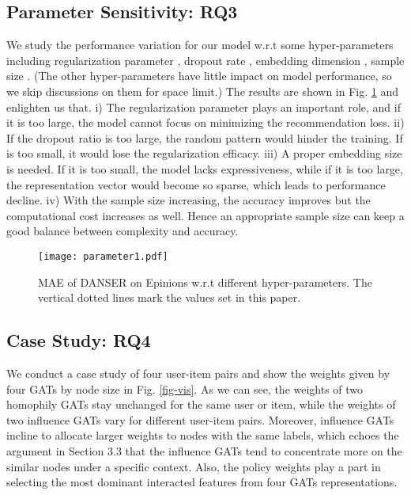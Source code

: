 \documentclass[sigconf]{acmart}
\begin{document}
\subsection{Parameter Sensitivity: RQ3}

We study the performance variation for our model w.r.t some hyper-parameters including regularization parameter , dropout rate , embedding dimension , sample size . (The other hyper-parameters have little impact on model performance, so we skip discussions on them for space limit.) The results are shown in Fig. \ref{fig-parameter} and enlighten us that. i) The regularization parameter plays an important role, and if it is too large, the model cannot focus on minimizing the recommendation loss. ii) If the dropout ratio is too large, the random pattern would hinder the training. If  is too small, it would lose the regularization efficacy. iii) A proper embedding size is needed. If it is too small, the model lacks expressiveness, while if it is too large, the representation vector would become so sparse, which leads to performance decline. iv) With the sample size increasing, the accuracy improves but the computational cost increases as well. Hence an appropriate sample size can keep a good balance between complexity and accuracy.

\begin{figure}[h]
	\centering
	\vspace{-5pt}
	\texttt{[image: parameter1.pdf]}
	\vspace{-10pt}
	\caption{MAE of DANSER on Epinions w.r.t different hyper-parameters. The vertical dotted lines mark the values set in this paper.}
	\label{fig-parameter}
	\vspace{-10pt}
\end{figure}

\subsection{Case Study: RQ4}

We conduct a case study of four user-item pairs and show the weights given by four GATs by node size in Fig. \ref{fig-vis}. As we can see, the weights of two homophily GATs stay unchanged for the same user or item, while the weights of two influence GATs vary for different user-item pairs. Moreover, influence GATs incline to allocate larger weights to nodes with the same labels, which echoes the argument in Section 3.3 that the influence GATs tend to concentrate more on the similar nodes under a specific context. Also, the policy weights play a part in selecting the most dominant interacted features from four GATs representations. 
\end{document}
